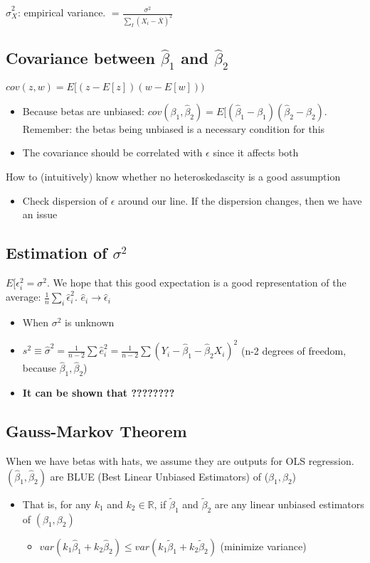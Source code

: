 \documentclass[10pt, oneside]{article}
\newcommand{\R}{\mathbb{R}}
\begin{document}
$\hat \sigma_X ^2$: empirical variance. $=\frac{\sigma^2}{\sum_I (X_i -\bar X)^2}$

\subsection{Covariance between $\hat \beta_1$ and $\hat \beta_2$}
$cov(z,w) = E[(z-E[z])(w-E[w]))$

\begin{itemize}
    \item Because betas are unbiased: $cov(\beta_1,\hat \beta_2)=E[(\hat \beta_1 -\beta_1)(\hat \beta_2 -\beta_2)$. Remember: the betas being unbiased is a necessary condition for this
    \item The covariance should be correlated with $\epsilon$ since it affects both
\end{itemize}

How to (intuitively) know whether no heteroskedascity is a good assumption
\begin{itemize}
    \item Check dispersion of $\epsilon$ around our line. If the dispersion changes, then we have an issue
\end{itemize}

\subsection{Estimation of $\sigma^2$}
$E[\epsilon_i ^2 = \sigma^2$. We hope that this good expectation is a good representation of the average: $\frac{1}{n} \sum_i \hat \epsilon_i ^2$. $\hat e_i \rightarrow \hat \epsilon_i$
\begin{itemize}
    \item When $\sigma^2$ is unknown
    \item $s^2 \equiv \hat \sigma^2 = \frac{1}{n-2}\sum \hat e_i ^2 = \frac{1}{n-2} \sum(Y_i -\hat \beta_1 -\hat \beta_2 X_i)^2$ (n-2 degrees of freedom, because $\hat \beta_1, \hat \beta_2$)
    \item \textbf{It can be shown that ????????}
\end{itemize}

\subsection{Gauss-Markov Theorem}
When we have betas with hats, we assume they are outputs for OLS regression.
$(\hat \beta_1, \hat \beta_2)$ are BLUE (Best Linear Unbiased Estimators) of ($\beta_1, \beta_2$)
\begin{itemize}
    \item That is, for any $k_1$ and $k_2 \in \R$, if $\tilde \beta_1$ and $\tilde \beta_2$ are any linear unbiased estimators of $(\beta_1,\beta_2)$
    \begin{itemize}
        \item $var(k_1\hat \beta_1 + k_2 \hat \beta_2) \leq var(k_1 \tilde \beta_1 + k_2 \tilde \beta_2)$ (minimize variance)
    \end{itemize}
\end{itemize}
\end{document}
